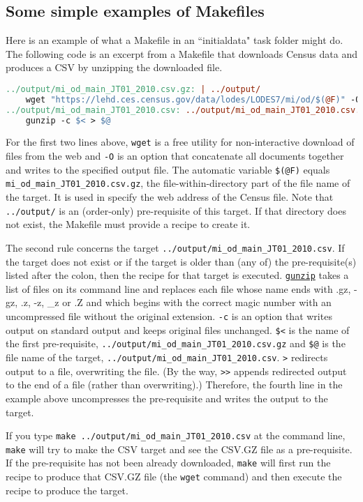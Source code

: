 \subsection{Some simple examples of Makefiles}
Here is an example of what a Makefile in an ``initialdata" task folder might do.
The following code is an excerpt from a Makefile that downloads Census data and produces a CSV by unzipping the downloaded file.
\begin{lstlisting}[language=make]
../output/mi_od_main_JT01_2010.csv.gz: | ../output/
	wget "https://lehd.ces.census.gov/data/lodes/LODES7/mi/od/$(@F)" -O ../output/$(@F)
../output/mi_od_main_JT01_2010.csv: ../output/mi_od_main_JT01_2010.csv.gz
	gunzip -c $< > $@
\end{lstlisting}
For the first two lines above, \texttt{wget} is a free utility for non-interactive download of files from the web and \texttt{-O} is an option that concatenate all documents together and writes to the specified output file. 
The automatic variable \texttt{\$(@F)} equals \texttt{mi\_od\_main\_JT01\_2010.csv.gz},
the file-within-directory part of the file name of the target. 
It is used in specify the web address of the Census file.
Note that \texttt{../output/} is an (order-only) pre-requisite of this target.
If that directory does not exist, the Makefile must provide a recipe to create it.

The second rule concerns the target \texttt{../output/mi\_od\_main\_JT01\_2010.csv}.
If the target  does not exist or if the target is older than (any of) the pre-requisite(s) listed after the colon,
then the recipe for that target is executed.
\href{https://linux.die.net/man/1/gunzip}{\texttt{gunzip}} takes a list of files on its command line and replaces each file whose name ends with .gz, -gz, .z, -z, \_z or .Z and which begins with the correct magic number with an uncompressed file without the original extension. 
\texttt{-c} is an option that writes output on standard output and keeps original files unchanged. 
\texttt{\$<} is the name of the first pre-requisite, \texttt{../output/mi\_od\_main\_JT01\_2010.csv.gz} and \texttt{\$@} is the file name of the target, \texttt{../output/mi\_od\_main\_JT01\_2010.csv}.
\texttt{>} redirects output to a file, overwriting the file. 
(By the way, \texttt{>>} appends redirected output to the end of a file (rather than overwriting).) 
Therefore, the fourth line in the example above uncompresses the pre-requisite and writes the output to the target.

If you type \texttt{make ../output/mi\_od\_main\_JT01\_2010.csv} at the command line, \texttt{make} will try to make the CSV target and see the CSV.GZ file as a pre-requisite. 
If the pre-requisite has not been already downloaded, \texttt{make} will first run the recipe to produce that CSV.GZ file (the \texttt{wget} command) and then execute the recipe to produce the target.

